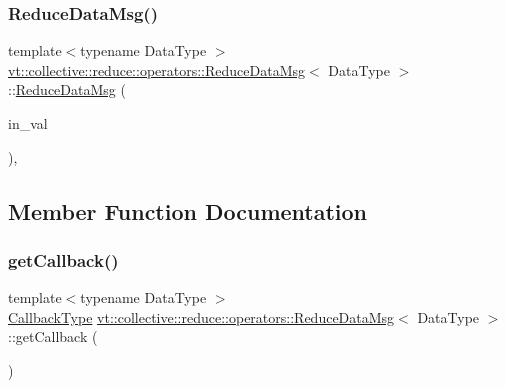 \mbox{\label{structvt_1_1collective_1_1reduce_1_1operators_1_1_reduce_data_msg_aced8854f365eaf92ca71d527337fc804}} 
\subsubsection{\texorpdfstring{Reduce\+Data\+Msg()}{ReduceDataMsg()}\hspace{0.1cm}{\footnotesize\ttfamily [3/3]}}
{\footnotesize\ttfamily template$<$typename Data\+Type $>$ \\
\hyperlink{structvt_1_1collective_1_1reduce_1_1operators_1_1_reduce_data_msg}{vt\+::collective\+::reduce\+::operators\+::\+Reduce\+Data\+Msg}$<$ Data\+Type $>$\+::\hyperlink{structvt_1_1collective_1_1reduce_1_1operators_1_1_reduce_data_msg}{Reduce\+Data\+Msg} (\begin{DoxyParamCaption}\item[{Data\+Type const \&}]{in\+\_\+val }\end{DoxyParamCaption})\hspace{0.3cm}{\ttfamily [inline]}, {\ttfamily [explicit]}}



\subsection{Member Function Documentation}
\mbox{\label{structvt_1_1collective_1_1reduce_1_1operators_1_1_reduce_data_msg_a108582ea1b61db277a5dae6ac08cc708}} 
\subsubsection{\texorpdfstring{get\+Callback()}{getCallback()}}
{\footnotesize\ttfamily template$<$typename Data\+Type $>$ \\
\hyperlink{structvt_1_1collective_1_1reduce_1_1operators_1_1_reduce_data_msg_a299d0d7f62e0e631ef344e345d89a4f3}{Callback\+Type} \hyperlink{structvt_1_1collective_1_1reduce_1_1operators_1_1_reduce_data_msg}{vt\+::collective\+::reduce\+::operators\+::\+Reduce\+Data\+Msg}$<$ Data\+Type $>$\+::get\+Callback (\begin{DoxyParamCaption}{ }\end{DoxyParamCaption})\hspace{0.3cm}{\ttfamily [inline]}}

